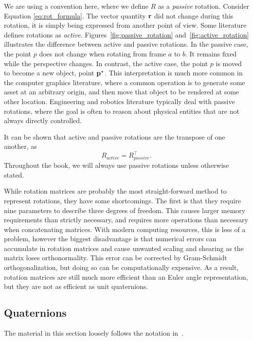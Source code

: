 We are using a convention here, where we define $R$ as a \emph{passive}
rotation. Consider Equation \ref{eq:rot_formula}. The vector quantity
$\mathbf{r}$ did not change during this rotation, it is simply being expressed
from another point of view. Some literature defines rotations as \emph{active}.
Figures~\ref{fig:passive_rotation} and~\ref{fig:active_rotation} illustrates the difference between
active and passive rotations. In the passive case, the point
$p$ does not change when rotating from frame $a$ to $b$. It remains
fixed while the perspective changes. In contrast, the active case, the point $p$ is moved to become a new object, point $\mathbf{p}^{\star}$.
This interpretation is much more common in the computer graphics literature,
where a common operation is to generate some asset at an arbitrary
origin, and then move that object to be rendered at some other location.
Engineering and robotics literature typically deal with passive rotations,
where the goal is often to reason about physical entities that are
not always directly controlled.

It can be shown that active and passive rotations are the transpose of
one another, as
\[
R_{active}=R_{passive}^{\top}.
\]
Throughout the book, we will always use passive rotations unless otherwise stated.

While rotation matrices are probably the most straight-forward method
to represent rotations, they have some shortcomings. The first is
that they require nine parameters to describe three degrees of freedom. This
causes larger memory requirements than strictly necessary, and requires
more operations than necessary when concatenating matrices.  With modern
computing resources, this is less of a problem, however the biggest
disadvantage is that numerical errors can accumulate in rotation matrices
and cause unwanted scaling and shearing as the matrix loses orthonormality.
This error can be corrected by Gram-Schmidt orthogonalization, but
doing so can be computationally expensive. As a result, rotation matrices
are still much more efficient than an Euler angle representation,
but they are not as efficient as unit quaternions.


\subsection{Quaternions}

The material in this section loosely follows the notation in~\cite[-3in]{TrawnyRoumeliotis05}.

